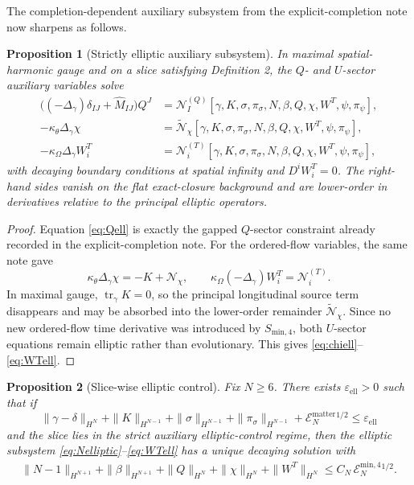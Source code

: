 \documentclass[11pt]{article}
\newtheorem{proposition}{Proposition}
\begin{document}
The completion-dependent auxiliary subsystem from the explicit-completion note now sharpens as follows.

\begin{proposition}[Strictly elliptic auxiliary subsystem]
In maximal spatial-harmonic gauge and on a slice satisfying Definition 2, the \(Q\)- and \(U\)-sector auxiliary variables solve
\begin{align}
\bigl((-\Delta_\gamma)\delta_{IJ}+\widehat M_{IJ}\bigr)Q^J
&=
\mathcal N_I^{(Q)}[\gamma,K,\sigma,\pi_\sigma,N,\beta,Q,\chi,W^T,\psi,\pi_\psi],
\label{eq:Qell}
\\
-\kappa_\theta\Delta_\gamma\chi
&=
\widetilde{\mathcal N}_\chi[\gamma,K,\sigma,\pi_\sigma,N,\beta,Q,\chi,W^T,\psi,\pi_\psi],
\label{eq:chiell}
\\
-\kappa_\Omega\Delta_\gamma W_i^T
&=
\mathcal N_i^{(T)}[\gamma,K,\sigma,\pi_\sigma,N,\beta,Q,\chi,W^T,\psi,\pi_\psi],
\label{eq:WTell}
\end{align}
with decaying boundary conditions at spatial infinity and \(D^iW_i^T=0\). The right-hand sides vanish on the flat exact-closure background and are lower-order in derivatives relative to the principal elliptic operators.
\end{proposition}

\begin{proof}
Equation \eqref{eq:Qell} is exactly the gapped \(Q\)-sector constraint already recorded in the explicit-completion note. For the ordered-flow variables, the same note gave
\[
\kappa_\theta\Delta_\gamma\chi
=
-K+\mathcal N_\chi,
\qquad
\kappa_\Omega(-\Delta_\gamma)W_i^T
=
\mathcal N_i^{(T)}.
\]
In maximal gauge, \(\operatorname{tr}_\gamma K=0\), so the principal longitudinal source term disappears and may be absorbed into the lower-order remainder \(\widetilde{\mathcal N}_\chi\). Since no new ordered-flow time derivative was introduced by \(S_{\mathrm{min},4}\), both \(U\)-sector equations remain elliptic rather than evolutionary. This gives \eqref{eq:chiell}--\eqref{eq:WTell}.
\end{proof}

\begin{proposition}[Slice-wise elliptic control]
Fix \(N\ge 6\). There exists \(\varepsilon_{\mathrm{ell}}>0\) such that if
\begin{equation}
\|\gamma-\delta\|_{H^N}
+\|K\|_{H^{N-1}}
+\|\sigma\|_{H^{N-1}}
+\|\pi_\sigma\|_{H^{N-1}}
+\mathcal E_N^{\mathrm{matter}}{}^{1/2}
\le
\varepsilon_{\mathrm{ell}}
\label{eq:ellsmall}
\end{equation}
and the slice lies in the strict auxiliary elliptic-control regime, then the elliptic subsystem \eqref{eq:Nelliptic}--\eqref{eq:WTell} has a unique decaying solution with
\begin{align}
\|N-1\|_{H^{N+1}}
+\|\beta\|_{H^{N+1}}
+\|Q\|_{H^N}
+\|\chi\|_{H^N}
+\|W^T\|_{H^N}
\le
C_N\,\mathcal E_N^{\mathrm{min},4}{}^{1/2}.
\label{eq:ellestimate}
\end{align}
\end{proposition}
\end{document}
